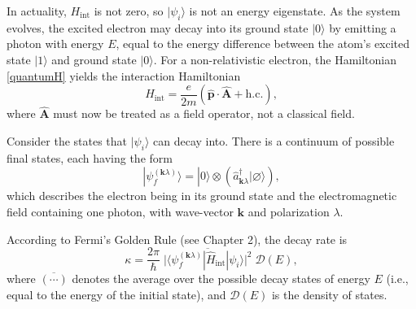 \documentclass[prx,12pt]{revtex4-2}
\begin{document}
In actuality, $H_{\mathrm{int}}$ is not zero, so $|\psi_i\rangle$ is
not an energy eigenstate.  As the system evolves, the excited electron
may decay into its ground state $|0\rangle$ by emitting a photon with
energy $E$, equal to the energy difference between the atom's excited
state $|1\rangle$ and ground state $|0\rangle$.  For a
non-relativistic electron, the Hamiltonian \eqref{quantumH} yields the
interaction Hamiltonian
\begin{equation}
  H_{\mathrm{int}} = \frac{e}{2m} \left( \hat{\mathbf{p}} \cdot \hat{\mathbf{A}} + \mathrm{h.c.}\right),
\end{equation}
where $\hat{\mathbf{A}}$ must now be treated as a field operator, not
a classical field.

Consider the states that $|\psi_i\rangle$ can decay into.  There is a
continuum of possible final states, each having the form
\begin{equation}
  | \psi_{f}^{(\mathbf{k}\lambda)} \rangle = |0\rangle \otimes
  \left( \hat{a}_{\mathbf{k}\lambda}^\dagger |\varnothing\rangle\right),
  \label{decaystate}
\end{equation}
which describes the electron being in its ground state and the
electromagnetic field containing one photon, with wave-vector
$\mathbf{k}$ and polarization $\lambda$.

According to Fermi's Golden Rule (see Chapter 2), the decay rate is
\begin{equation}
  \kappa = \frac{2\pi}{\hbar} \;
  \overline{\Big| \langle \psi_{f}^{(\mathbf{k}\lambda)} | \hat{H}_{\mathrm{int}}|\psi_i\rangle\Big|^2} \;
  \mathcal{D}(E),
\end{equation}
where $\overline{(\cdots)}$ denotes the average over the possible
decay states of energy $E$ (i.e., equal to the energy of the initial
state), and $\mathcal{D}(E)$ is the density of states.
\end{document}
